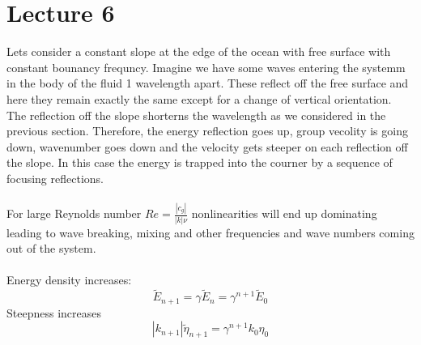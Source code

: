 \documentclass{article}
\begin{document}
\section{Lecture 6}
Lets consider a constant slope at the edge of the ocean with free surface with constant bounancy frequncy. Imagine we have some waves entering the systemm in the body of the fluid 1 wavelength apart. These reflect off the free surface and here they remain exactly the same except for a change of vertical orientation. The reflection off the slope shorterns the wavelength as we considered in the previous section. Therefore, the energy reflection goes up, group vecolity is going down, wavenumber goes down and the velocity gets steeper on each reflection off the slope. In this case the energy is trapped into the courner by a sequence of focusing reflections.\\\\
For large Reynolds number $Re = \frac{|c_g|}{|k| \nu}$ nonlinearities will end up dominating leading to wave breaking, mixing and other frequencies and wave numbers coming out of the system.\\\\
Energy density increases:
$$
\tilde E_{n+1} = \gamma \tilde E_{n} = \gamma^{n+1} \tilde E_0
$$
Steepness increases
$$
|k_{n+1}| \tilde \eta_{n+1} = \gamma^{n+1} k_0 \eta_{0}
$$
\end{document}
